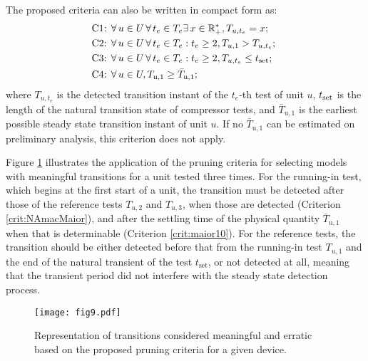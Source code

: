 \documentclass[preprint,11pt,number]{elsarticle}
\begin{document}
The proposed criteria can also be written in compact form as:
\begin{equation}
    \begin{gathered}
        \hfilneg \text{C1: } \forall\, u \in U\, \forall\, t_e \in T_e \exists \, x \in \mathbb{R}_+^*, T_{u,t_e} = x;\\
        \hfilneg \text{C2: } \forall\, u \in U \,\forall\, t_e \in T_e: t_e \geq 2, T_{u,1}>T_{u,t_e}; \
        \\\hfilneg \text{C3: } \forall\, u \in U \,\forall\, t_e \in T_e: t_e \geq 2, T_{u,t_e}\leq t_{\rm set}; 
        \\\hfilneg \text{C4: } \forall\, u \in U, T_{\text{u},1}\geq \bar{T}_{\text{u},1};
    \end{gathered}
\end{equation}
%
\noindent where $T_{u,t_e}$ is the detected transition instant of the $t_e$-th test of unit $u$, $t_{\rm set}$ is the length of the natural transition state of compressor tests, and $\bar{T}_{\text{u},1}$ is the earliest possible steady state transition instant of unit $u$. If no $\bar{T}_{\text{u},1}$ can be estimated on preliminary analysis, this criterion does not apply.

\color{red} Figure \ref{fig:pruningCriteria} illustrates the application of the pruning criteria for selecting models with meaningful transitions for a unit tested three times. For the running-in test, which begins at the first start of a unit, the transition must be detected after those of the reference tests $T_{u,2}$ and $T_{u,3}$, when those are detected (Criterion \ref{crit:NAmacMaior}), and after the settling time of the physical quantity $\bar{T}_{\text{u},1}$ when that is determinable (Criterion \ref{crit:maior10}). For the reference tests, the transition should be either detected before that from the running-in test $T_{u,1}$ and the end of the natural transient of the test $t_{\text{set}}$, or not detected at all, meaning that the transient period did not interfere with the steady state detection process. \color{black}

\begin{figure}[htb]
\begin{center}
\texttt{[image: fig9.pdf]}    %
\color{red}
\caption{Representation of transitions considered meaningful and erratic based on the proposed pruning criteria for a given device.}
\label{fig:pruningCriteria}
\end{center}
\end{figure}
\end{document}
